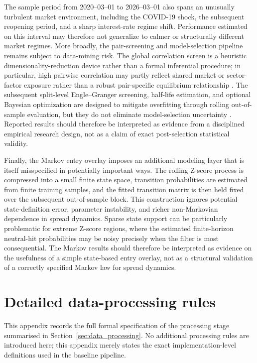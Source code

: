 \documentclass[11pt,a4paper]{article}
\begin{document}
The sample period from 2020--03--01 to 2026--03--01 also spans an unusually
turbulent market environment, including the COVID-19 shock, the subsequent
reopening period, and a sharp interest-rate regime shift. Performance estimated
on this interval may therefore not generalize to calmer or structurally
different market regimes. More broadly, the pair-screening and model-selection
pipeline remains subject to data-mining risk. The global correlation screen is a
heuristic dimensionality-reduction device rather than a formal inferential
procedure; in particular, high pairwise correlation may partly reflect shared
market or sector-factor exposure rather than a robust pair-specific equilibrium
relationship \cite{fama1993common}. The subsequent split-level
Engle--Granger screening, half-life estimation, and optional Bayesian
optimization are designed to mitigate overfitting through rolling out-of-sample
evaluation, but they do not eliminate model-selection uncertainty
\cite{harvey2016and,bailey2017probability}. Reported results should therefore be
interpreted as evidence from a disciplined empirical research design, not as a
claim of exact post-selection statistical validity.

Finally, the Markov entry overlay imposes an additional modeling layer that is
itself misspecified in potentially important ways. The rolling Z-score process
is compressed into a small finite state space, transition probabilities are
estimated from finite training samples, and the fitted transition matrix is then
held fixed over the subsequent out-of-sample block. This construction ignores
potential state-definition error, parameter instability, and richer
non-Markovian dependence in spread dynamics. Sparse state support can be
particularly problematic for extreme Z-score regions, where the estimated
finite-horizon neutral-hit probabilities may be noisy precisely when the filter
is most consequential. The Markov results should therefore be interpreted as
evidence on the usefulness of a simple state-based entry overlay, not as a
structural validation of a correctly specified Markov law for spread dynamics.

\appendix 

\section{Detailed data-processing rules}\label{app:data_processing_details}

This appendix records the full formal specification of the processing stage
summarised in Section~\ref{sec:data_processing}. No additional processing rules
are introduced here; this appendix merely states the exact implementation-level
definitions used in the baseline pipeline.
\end{document}
